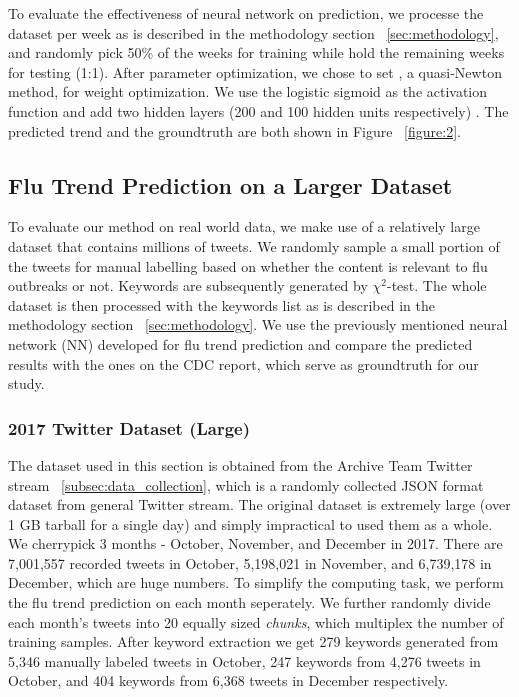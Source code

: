 \documentclass[12pt, oneside]{article}
\begin{document}
To evaluate the effectiveness of neural network on prediction, we processe the dataset per week as is described in the methodology section ~\ref{sec:methodology},
and randomly pick 50\% of the weeks for training while hold the remaining weeks for testing (1:1). After parameter optimization, we chose to set ,
a quasi-Newton method, for weight optimization. We use the logistic sigmoid as the activation function and add two hidden layers (200 and 100 hidden units respectively)
\cite{nn-mlpregressor}. The predicted trend and the groundtruth are both shown in Figure ~\ref{figure:2}.


\subsection{Flu Trend Prediction on a Larger Dataset}

To evaluate our method on real world data, we make use of a relatively large dataset that contains millions of tweets.
We randomly sample a small portion of the tweets for manual labelling based on whether the content is relevant to flu outbreaks or not.
Keywords are subsequently generated by $\chi^2$-test.
The whole dataset is then processed with the keywords list as is described in the methodology section ~\ref{sec:methodology}.
We use the previously mentioned neural network (NN) developed for flu trend prediction and compare the predicted results with the ones on the CDC report,
which serve as groundtruth for our study.

\subsubsection{2017 Twitter Dataset (Large)}
The dataset used in this section is obtained from the Archive Team Twitter stream \cite{tweets-archive} ~\ref{subsec:data_collection},
which is a randomly collected JSON format dataset from general Twitter stream.
The original dataset is extremely large (over 1 GB tarball for a single day) and simply impractical to used them as a whole.
We cherrypick 3 months - October, November, and December in 2017.
There are 7,001,557 recorded tweets in October, 5,198,021 in November, and 6,739,178 in December, which are huge numbers.
To simplify the computing task, we perform the flu trend prediction on each month seperately.
We further randomly divide each month's tweets into 20 equally sized \textit{chunks},
which multiplex the number of training samples. After keyword extraction we get 279 keywords generated from 5,346 manually labeled tweets in October, 247 keywords from 4,276 tweets in October, and 404 keywords from 6,368 tweets in December respectively.
\end{document}

